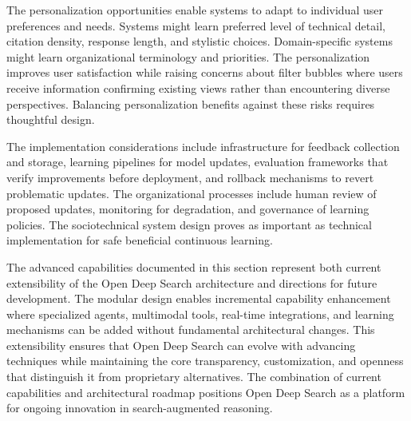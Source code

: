 The personalization opportunities enable systems to adapt to individual user preferences and needs. Systems might learn preferred level of technical detail, citation density, response length, and stylistic choices. Domain-specific systems might learn organizational terminology and priorities. The personalization improves user satisfaction while raising concerns about filter bubbles where users receive information confirming existing views rather than encountering diverse perspectives. Balancing personalization benefits against these risks requires thoughtful design.

The implementation considerations include infrastructure for feedback collection and storage, learning pipelines for model updates, evaluation frameworks that verify improvements before deployment, and rollback mechanisms to revert problematic updates. The organizational processes include human review of proposed updates, monitoring for degradation, and governance of learning policies. The sociotechnical system design proves as important as technical implementation for safe beneficial continuous learning.

The advanced capabilities documented in this section represent both current extensibility of the Open Deep Search architecture and directions for future development. The modular design enables incremental capability enhancement where specialized agents, multimodal tools, real-time integrations, and learning mechanisms can be added without fundamental architectural changes. This extensibility ensures that Open Deep Search can evolve with advancing techniques while maintaining the core transparency, customization, and openness that distinguish it from proprietary alternatives. The combination of current capabilities and architectural roadmap positions Open Deep Search as a platform for ongoing innovation in search-augmented reasoning.
